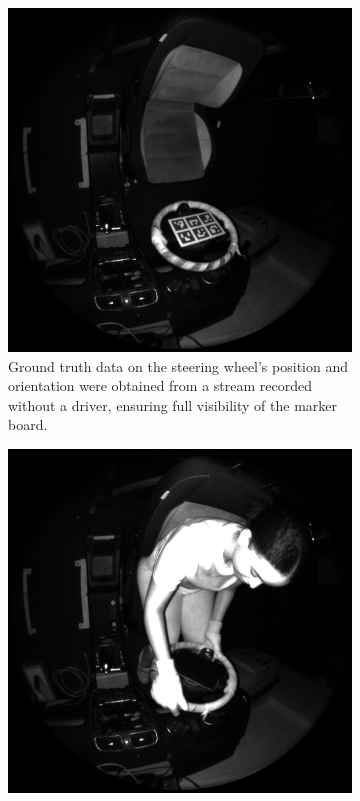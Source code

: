 \begin{figure}[ht]
    \centering
    \begin{subfigure}[t]{0.45\textwidth}
        \centering
        \includegraphics[width=\textwidth]{media/chapter 3/gt_stream.png}
        \caption{Ground truth data on the steering wheel’s 
        position and orientation were obtained from a stream 
        recorded without a driver, ensuring full visibility 
        of the marker board.}
        \label{fig:gt_stream}
    \end{subfigure}\hfill
    \begin{subfigure}[t]{0.45\textwidth}
        \centering
        \includegraphics[width=\textwidth]{media/chapter 3/main_stream.png}

\end{subfigure}
\end{figure}
